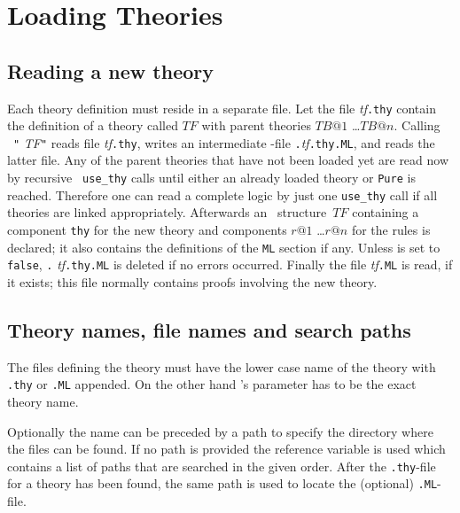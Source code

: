 \section{Loading Theories}
\label{LoadingTheories}

\subsection{Reading a new theory}

Each theory definition must reside in a separate file.  Let the file {\it
  tf}{\tt.thy} contain the definition of a theory called $TF$ with parent
theories $TB@1$ \dots $TB@n$.  Calling ~{\tt"}{\it
  TF\/}{\tt"} reads file {\it tf}{\tt.thy}, writes an intermediate \ML-file
{\tt.}{\it tf}{\tt.thy.ML}, and reads the latter file. Any of the parent
theories that have not been loaded yet are read now by recursive {\tt
  use_thy} calls until either an already loaded theory or {\tt Pure} is
reached.  Therefore one can read a complete logic by just one {\tt use_thy}
call if all theories are linked appropriately.  Afterwards an \ML\ 
structure~$TF$ containing a component {\tt thy} for the new theory and
components $r@1$ \dots $r@n$ for the rules is declared; it also contains the
definitions of the {\tt ML} section if any. Unless
 is set to {\tt false}, {\tt.}{\it
  tf}{\tt.thy.ML} is deleted if no errors occurred. Finally the file {\it
  tf}{\tt.ML} is read, if it exists; this file normally contains proofs
involving the new theory.


\subsection{Theory names, file names and search paths}

\begin{warn}
  The files defining the theory must have the lower case name of the theory
  with {\tt.thy} or {\tt.ML} appended.  On the other hand \ttindex{use_thy}'s
  parameter has to be the exact theory name.
\end{warn}
Optionally the name can be preceded by a path to specify the directory where
the files can be found.  If no path is provided the reference variable
\ttindexbold{loadpath} is used which contains a list of paths that are
searched in the given order.  After the {\tt.thy}-file for a theory has
been found, the same path is used to locate the (optional) {\tt.ML}-file.

